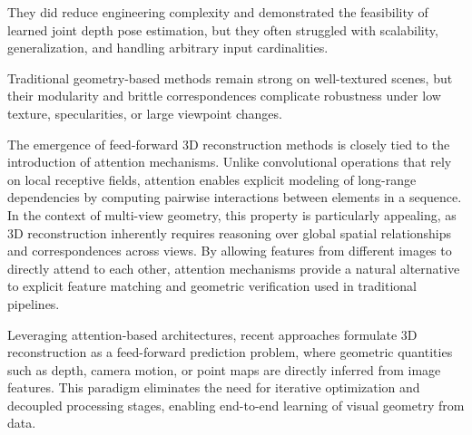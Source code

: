 They did reduce engineering complexity and demonstrated the feasibility of learned joint depth pose estimation, but they often struggled with scalability, generalization, and handling arbitrary input cardinalities.\cite{lin2025da3}

\label{sec:feed_forward_reconstruction}
Traditional geometry-based methods remain strong on well-textured scenes, but their modularity and brittle correspondences complicate robustness under low texture, specularities, or large viewpoint changes.

The emergence of feed-forward 3D reconstruction methods is closely tied to the introduction of attention mechanisms. Unlike convolutional operations that rely on local receptive fields, attention enables explicit modeling of long-range dependencies by computing pairwise interactions between elements in a sequence.
In the context of multi-view geometry, this property is particularly appealing, as 3D reconstruction inherently requires reasoning over global spatial relationships and correspondences across views. By allowing features from different images to directly attend to each other, attention mechanisms provide a natural alternative to explicit feature matching and geometric verification used in traditional pipelines.

Leveraging attention-based architectures, recent approaches formulate 3D reconstruction as a feed-forward prediction problem, where geometric quantities such as depth, camera motion, or point maps are directly inferred from image features. This paradigm eliminates the need for iterative optimization and decoupled processing stages, enabling end-to-end learning of visual geometry from data.

